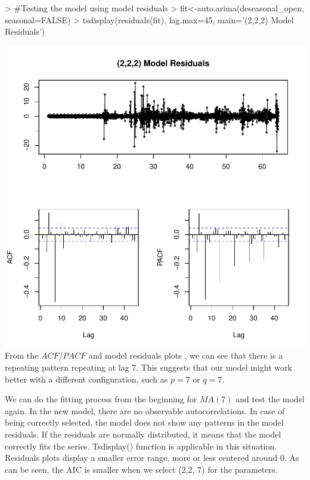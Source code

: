 \documentclass{article}
\begin{document}
\begin{Schunk}
\begin{Sinput}
> #Testing the model using model residuals
> fit<-auto.arima(deseasonal_open, seasonal=FALSE)
> tsdisplay(residuals(fit), lag.max=45, main='(2,2,2) Model Residuals')
\end{Sinput}
\end{Schunk}
\includegraphics{Report-017}
From the $ACF$/$PACF$ and model residuals plots , we can see that there is a repeating pattern repeating at lag 7. This suggests that our model might work better with a different configuration, such as $p = 7$ or $q = 7$. 

We can do the fitting process from the beginning for $MA(7)$ and test the model again. In the new model, there are no observable autocorrelations. In case of being correctly selected, the model does not show any patterns in the model residuals. If the residuals are normally distributed, it means that the model correctly fits the series. Tsdisplay() function is applicable in this situation. Residuals plots display a smaller error range, more or less centered around 0. As can be seen, the AIC is smaller when we select ($2$,$2$, $7$) for the parameters.
\end{document}

